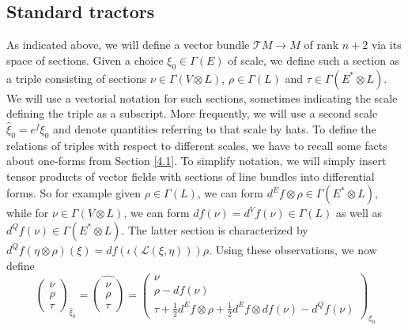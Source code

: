 \documentclass[11pt]{amsart}
\numberwithin{proposition}{section}
\numberwithin{equation}{section}
\begin{document}
\subsection{Standard tractors}\label{4.3}
As indicated above, we will define a vector bundle $\mathcal TM\to M$ of rank $n+2$ via its space of sections. Given a choice $\xi_0\in\Gamma(E)$ of scale, we define such a section as a triple consisting of sections $\nu\in\Gamma(V\otimes L)$, $\rho\in\Gamma(L)$ and $\tau\in\Gamma(E^*\otimes L)$. We will use a vectorial notation for such sections, sometimes indicating the scale defining the triple as a subscript. More frequently, we will use a second scale $\hat\xi_0=e^f\xi_0$ and denote quantities referring to that scale by hats. To define the relations of triples with respect to different scales, we have to recall some facts about one-forms from Section \ref{4.1}. To simplify notation, we will simply insert tensor products of vector fields with sections of line bundles into differential forms. So for example given $\rho\in\Gamma(L)$, we can form $d^Ef\otimes \rho\in\Gamma(E^*\otimes L)$, while for $\nu\in\Gamma(V\otimes L)$, we can form $df(\nu)=d^Vf(\nu)\in\Gamma(L)$ as well as $d^Qf(\nu)\in\Gamma(E^*\otimes L)$. The latter section is characterized by $d^Qf(\eta\otimes\rho)(\xi)=df(\iota(\mathcal L(\xi,\eta)))\rho$. Using these observations, we now define
\begin{equation}\label{tract-change}
\begin{pmatrix} \nu\\ \rho \\ \tau \end{pmatrix}_{\hat\xi_0}=\widehat{\begin{pmatrix} \nu\\ \rho \\ \tau \end{pmatrix}}=\begin{pmatrix} \nu\\ \rho-df(\nu) \\ \tau+\frac12d^Ef\otimes\rho+\frac12d^Ef\otimes df(\nu)-d^Qf(\nu)\end{pmatrix}_{\xi_0}
\end{equation}
\end{document}

